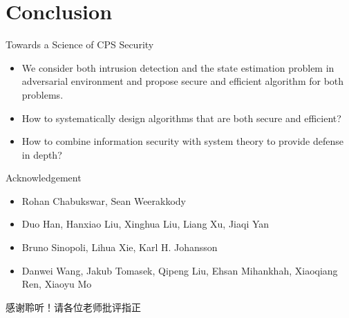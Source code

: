\documentclass[10pt]{beamer}
\begin{document}
\section{Conclusion}

\begin{frame}{Towards a Science of CPS Security}
  \begin{itemize}
  \item We consider both intrusion detection and the state estimation problem in adversarial environment and propose secure and efficient algorithm for both problems.
  \item How to systematically design algorithms that are both secure and efficient?
  \item How to combine information security with system theory to provide defense in depth?
  \end{itemize}
\end{frame}

\begin{frame}{Acknowledgement}
  \begin{itemize}
  \item Rohan Chabukswar, Sean Weerakkody
  \item Duo Han, Hanxiao Liu, Xinghua Liu, Liang Xu, Jiaqi Yan
  \item Bruno Sinopoli, Lihua Xie, Karl H. Johansson
  \item Danwei Wang, Jakub Tomasek, Qipeng Liu, Ehsan Mihankhah, Xiaoqiang Ren, Xiaoyu Mo 
  \end{itemize}
\end{frame}


%

\begin{frame}[standout]
  感谢聆听！请各位老师批评指正
\end{frame}
\end{document}

